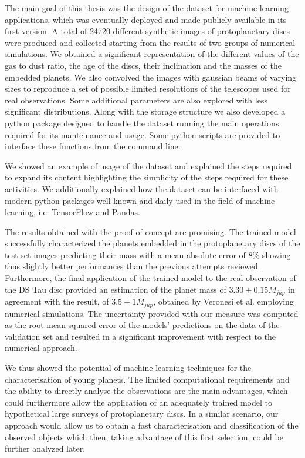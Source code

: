 \documentclass[a4paper,10pt]{report}
\begin{document}
The main goal of this thesis was the design of the dataset for machine learning applications,
which was eventually deployed and made publicly available in its first version. A total of 24720 different synthetic
images of protoplanetary discs were produced and collected starting from the results of two groups of numerical simulations.
We obtained a significant representation of the different values of the gas to dust ratio, the age of the discs,
their inclination and the masses of the embedded 
planets. We also convolved the images with gaussian beams of varying sizes to reproduce a set of possible limited resolutions
of the telescopes used for real observations. 
Some additional parameters are also explored with less significant distributions.
Along with the storage structure we also developed a python package designed to handle the dataset
running the main operations required for its manteinance and usage. 
Some python scripts are provided to interface these functions
from the command line.

We showed an example of usage of the dataset and explained the steps required to expand its content
highlighting the simplicity of the steps required for these activities.
We additionally explained how the dataset can be interfaced with modern python packages
well known and daily used in the field
of machine learning, i.e. TensorFlow and Pandas.

The results obtained with the proof of concept are promising. The trained model successfully
characterized the planets embedded in the protoplanetary discs of the test set images predicting their mass
with a mean absolute error of 8\% showing thus slightly better performances
than the previous attempts reviewed \cite{Auddy_2020}.
Furthermore, the final application of the trained model to the real observation of the DS Tau disc
provided an estimation of the planet mass of $3.30 \pm 0.15 M_{jup}$ in agreement with the result, of
$3.5 \pm 1 M_{jup}$,
obtained by Veronesi et al. \cite{dstauv} employing numerical simulations. The uncertainty provided 
with our measure was computed as the root mean squared error of the models' predictions on the data of the validation
set and resulted in a significant improvement with respect to the numerical approach.

We thus showed the potential of machine learning techniques for the characterisation of 
young planets. The limited computational requirements and the ability to
directly analyse the observations are the main advantages, which could
furthermore allow the application of an adequately trained model to hypothetical large surveys
of protoplanetary discs. In a similar scenario, our approach would allow us to obtain a fast characterisation
and classification of the observed objects which then, taking advantage of this first selection,
could be further analyzed later.
\end{document}
